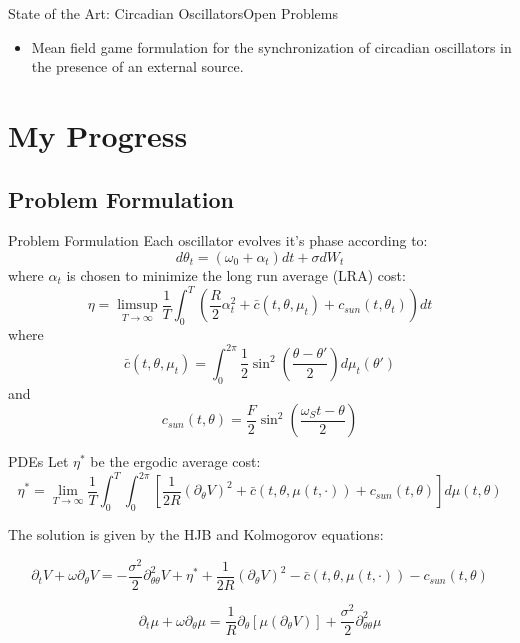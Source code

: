 \documentclass{beamer}
\begin{document}
\begin{frame}{State of the Art: Circadian Oscillators}{Open Problems}
	\begin{itemize}
		\item { Mean field game formulation for the synchronization of circadian oscillators in the presence of an external source.
		}
	\end{itemize}
\end{frame}

\section{My Progress}

\subsection{Problem Formulation}

\begin{frame}{Problem Formulation}
		Each oscillator evolves it's phase according to:
		\begin{equation}
		d\theta_t=(\omega_0+\alpha_t)dt+\sigma dW_t
		\end{equation}
		where $\alpha_t$ is chosen to minimize the long run average (LRA) cost:
		\begin{equation}
		\eta=\limsup_{T \rightarrow \infty} \frac{1}{T}\int_0^T \left(\frac{R}{2} \alpha_t^2+\bar{c}(t,\theta,\mu_t)+c_{sun}(t,\theta_t) \right) dt
		\end{equation}
		where
		\begin{equation}
		\bar{c}(t,\theta,\mu_t)=\int_0^{2\pi}\frac{1}{2}\sin^2\left(\frac{\theta-\theta'}{2}\right) d\mu_t(\theta')
		\end{equation}
		and
		\begin{equation}
		c_{sun}(t,\theta)=\frac{F}{2}\sin^2\left(\frac{\omega_St-\theta}{2}\right)
		\end{equation}
\end{frame}

\begin{frame}{PDEs}
	Let $\eta^*$ be the ergodic average cost:
	\begin{equation}
	\eta^*=\lim_{T \rightarrow \infty} \frac{1}{T} \int_0^T \int_0^{2\pi} \left[\frac{1}{2R}(\partial_\theta V)^2+\bar{c}(t,\theta,\mu(t,\cdot))+c_{sun}(t,\theta) \right] d\mu(t,\theta)
	\end{equation}
	
	The solution is given by the HJB and Kolmogorov equations:
	
	\begin{equation}
	\partial_t V+\omega \partial_\theta V=-\frac{\sigma^2}{2}\partial_{\theta \theta}^2 V+\eta^*+\frac{1}{2R}(\partial_\theta V)^2-\bar{c}(t,\theta,\mu(t,\cdot))-c_{sun}(t,\theta)
	\label{HJB}
	\end{equation}
	
	\begin{equation}
	\partial_t \mu+\omega \partial_{\theta} \mu= \frac{1}{R} \partial_{\theta}\left[\mu(\partial_\theta V) \right]+ \frac{\sigma^2}{2} \partial_{\theta \theta}^2 \mu
	\label{Kolmogorov}
	\end{equation}
\end{frame}
\end{document}
